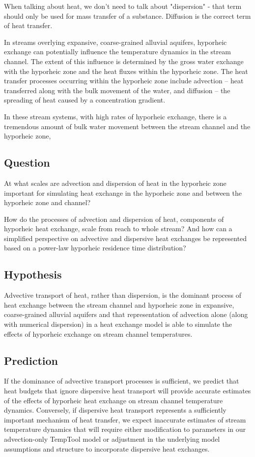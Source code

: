 \documentclass[a4paper]{article}
\begin{document}
When talking about heat, we don't need to talk about "dispersion" - that term should only be used for mass transfer of a substance. Diffusion is the correct term of heat transfer.

In streams overlying expansive, coarse-grained alluvial aquifers, hyporheic exchange can potentially influence the temperature dynamics in the stream channel. The extent of this influence is determined by the gross water exchange with the hyporheic zone and the heat fluxes within the hyporheic zone. The heat transfer processes occurring within the hyporheic zone include advection -- heat transferred along with the bulk movement of the water,  and diffusion -- the spreading of heat caused by a concentration gradient. 

In these stream systems, with high rates of hyporheic exchange, there is a tremendous amount of bulk water movement between the stream channel and the hyporheic zone,

\subsection*{Question}
At what scales are advection and dispersion of heat in the hyporheic zone important for simulating heat exchange in the hyporheic zone and between the hyporheic zone and channel?

How do the processes of advection and dispersion of heat, components of hyporheic heat exchange, scale from reach to whole stream? And how can a simplified perspective on advective and dispersive heat exchanges  be represented based on a power-law hyporheic residence time distribution?


\subsection*{Hypothesis}
Advective transport of heat, rather than dispersion, is the dominant process of heat exchange between the stream channel and hyporheic zone in expansive, coarse-grained alluvial aquifers and that representation of advection alone (along with numerical dispersion) in a heat exchange model is able to simulate the effects of hyporheic exchange on stream channel temperatures.

\subsection*{Prediction}
If the dominance of advective transport processes is sufficient, we predict that heat budgets that ignore dispersive heat transport will provide accurate estimates of the effects of hyporheic heat exchange on stream channel temperature dynamics. Conversely, if dispersive heat transport represents a sufficiently important mechanism of heat transfer, we expect inaccurate estimates of stream temperature dynamics that will require either modification to parameters in our advection-only TempTool model or adjustment in the underlying model assumptions and structure to incorporate dispersive heat exchanges.
\end{document}
